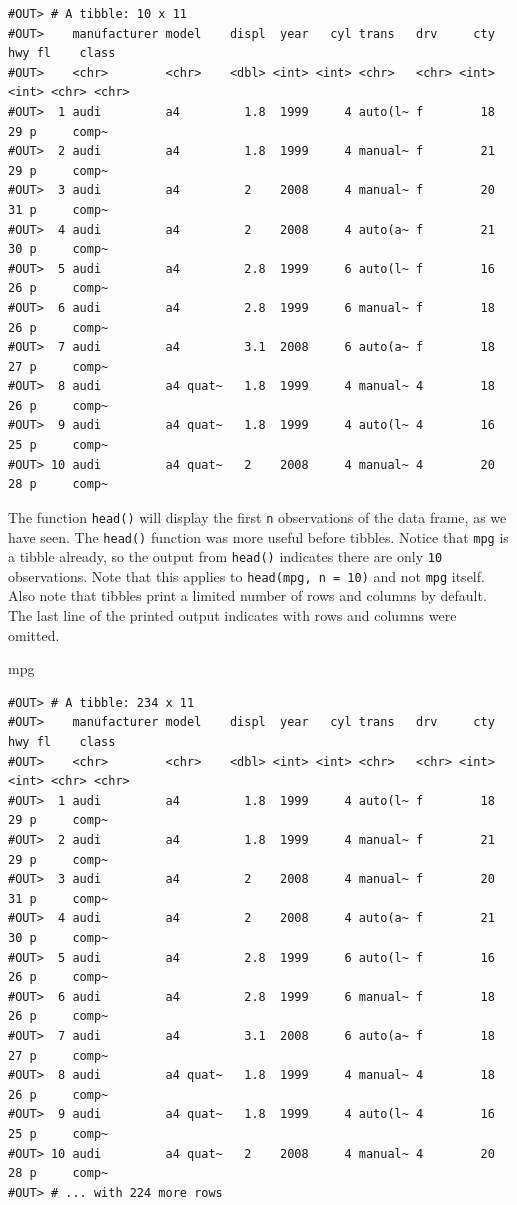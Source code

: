 \documentclass[]{book}
\newenvironment{Shaded}{\begin{snugshade}}{\end{snugshade}}
\newcommand{\NormalTok}[1]{#1}
\begin{document}
\begin{verbatim}
#OUT> # A tibble: 10 x 11
#OUT>    manufacturer model    displ  year   cyl trans   drv     cty   hwy fl    class
#OUT>    <chr>        <chr>    <dbl> <int> <int> <chr>   <chr> <int> <int> <chr> <chr>
#OUT>  1 audi         a4         1.8  1999     4 auto(l~ f        18    29 p     comp~
#OUT>  2 audi         a4         1.8  1999     4 manual~ f        21    29 p     comp~
#OUT>  3 audi         a4         2    2008     4 manual~ f        20    31 p     comp~
#OUT>  4 audi         a4         2    2008     4 auto(a~ f        21    30 p     comp~
#OUT>  5 audi         a4         2.8  1999     6 auto(l~ f        16    26 p     comp~
#OUT>  6 audi         a4         2.8  1999     6 manual~ f        18    26 p     comp~
#OUT>  7 audi         a4         3.1  2008     6 auto(a~ f        18    27 p     comp~
#OUT>  8 audi         a4 quat~   1.8  1999     4 manual~ 4        18    26 p     comp~
#OUT>  9 audi         a4 quat~   1.8  1999     4 auto(l~ 4        16    25 p     comp~
#OUT> 10 audi         a4 quat~   2    2008     4 manual~ 4        20    28 p     comp~
\end{verbatim}

The function \texttt{head()} will display the first \texttt{n}
observations of the data frame, as we have seen. The \texttt{head()}
function was more useful before tibbles. Notice that \texttt{mpg} is a
tibble already, so the output from \texttt{head()} indicates there are
only \texttt{10} observations. Note that this applies to
\texttt{head(mpg,\ n\ =\ 10)} and not \texttt{mpg} itself. Also note
that tibbles print a limited number of rows and columns by default. The
last line of the printed output indicates with rows and columns were
omitted.

\begin{Shaded}
\begin{Highlighting}[]
\NormalTok{mpg}
\end{Highlighting}
\end{Shaded}

\begin{verbatim}
#OUT> # A tibble: 234 x 11
#OUT>    manufacturer model    displ  year   cyl trans   drv     cty   hwy fl    class
#OUT>    <chr>        <chr>    <dbl> <int> <int> <chr>   <chr> <int> <int> <chr> <chr>
#OUT>  1 audi         a4         1.8  1999     4 auto(l~ f        18    29 p     comp~
#OUT>  2 audi         a4         1.8  1999     4 manual~ f        21    29 p     comp~
#OUT>  3 audi         a4         2    2008     4 manual~ f        20    31 p     comp~
#OUT>  4 audi         a4         2    2008     4 auto(a~ f        21    30 p     comp~
#OUT>  5 audi         a4         2.8  1999     6 auto(l~ f        16    26 p     comp~
#OUT>  6 audi         a4         2.8  1999     6 manual~ f        18    26 p     comp~
#OUT>  7 audi         a4         3.1  2008     6 auto(a~ f        18    27 p     comp~
#OUT>  8 audi         a4 quat~   1.8  1999     4 manual~ 4        18    26 p     comp~
#OUT>  9 audi         a4 quat~   1.8  1999     4 auto(l~ 4        16    25 p     comp~
#OUT> 10 audi         a4 quat~   2    2008     4 manual~ 4        20    28 p     comp~
#OUT> # ... with 224 more rows
\end{verbatim}
\end{document}
